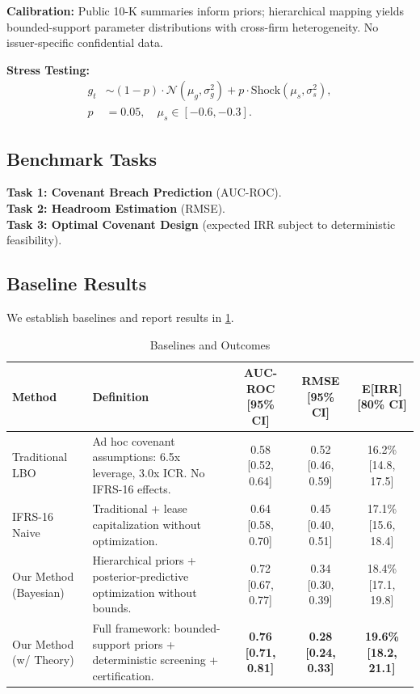 \documentclass[11pt,a4paper]{article}
\theoremstyle{plain}
\theoremstyle{definition}
\newcommand{\cref}[1]{\ref{#1}}
\begin{document}
\textbf{Calibration:} Public 10-K summaries inform priors; hierarchical mapping yields bounded-support parameter distributions with cross-firm heterogeneity. No issuer-specific confidential data.

\textbf{Stress Testing:}
\begin{align}
 g_t &\sim (1-p)\cdot \mathcal{N}(\mu_g,\sigma_g^2) + p\cdot \text{Shock}(\mu_s,\sigma_s^2), \\
 p&=0.05,\quad \mu_s\in[-0.6,-0.3].
\end{align}

\subsection{Benchmark Tasks}

\textbf{Task 1: Covenant Breach Prediction} (AUC-ROC). \\
\textbf{Task 2: Headroom Estimation} (RMSE). \\
\textbf{Task 3: Optimal Covenant Design} (expected IRR subject to deterministic feasibility).

\subsection{Baseline Results}

We establish baselines and report results in \cref{tab:baselines_and_outcomes}.

\begin{table}[H]
\centering
\caption{Baselines and Outcomes}
\label{tab:baselines_and_outcomes}
\begin{tabular}{lp{5cm}ccc}
\toprule
Method & Definition & AUC-ROC [95\% CI] & RMSE [95\% CI] & E[IRR] [80\% CI] \\
\midrule
Traditional LBO & Ad hoc covenant assumptions: 6.5x leverage, 3.0x ICR. No IFRS-16 effects. & 0.58 [0.52, 0.64] & 0.52 [0.46, 0.59] & 16.2\% [14.8, 17.5] \\
IFRS-16 Naive & Traditional + lease capitalization without optimization. & 0.64 [0.58, 0.70] & 0.45 [0.40, 0.51] & 17.1\% [15.6, 18.4] \\
Our Method (Bayesian) & Hierarchical priors + posterior-predictive optimization without bounds. & 0.72 [0.67, 0.77] & 0.34 [0.30, 0.39] & 18.4\% [17.1, 19.8] \\
Our Method (w/ Theory) & Full framework: bounded-support priors + deterministic screening + certification. & \textbf{0.76 [0.71, 0.81]} & \textbf{0.28 [0.24, 0.33]} & \textbf{19.6\% [18.2, 21.1]} \\
\bottomrule
\end{tabular}
\end{table}
\end{document}
